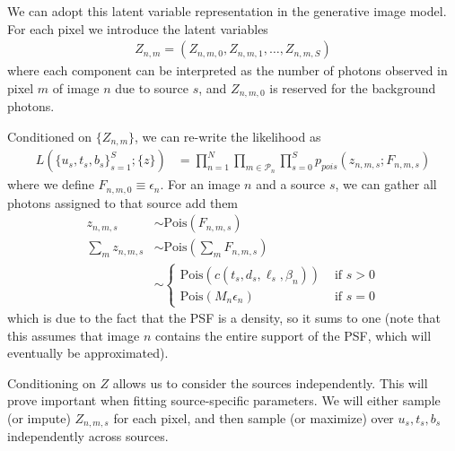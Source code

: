 \documentclass[11pt]{article}
\begin{document}
We can adopt this latent variable representation in the generative image model.  For each pixel we introduce the latent variables
\begin{align}
 Z_{n,m} = (Z_{n,m,0}, Z_{n,m,1}, \dots, Z_{n,m,S})
\end{align}
where each component can be interpreted as the number of photons observed in pixel $m$ of image $n$ due to source $s$, and $Z_{n,m,0}$ is reserved for the background photons.  

Conditioned on $\{Z_{n,m}\}$, we can re-write the likelihood as 
\begin{align}
  L(\{u_s, t_s, b_s\}_{s=1}^S; \{z\})
     &= \prod_{n=1}^N \prod_{m \in \mathcal{P}_n} \prod_{s=0}^S  p_{pois}(z_{n,m,s} ; F_{n,m, s}) 
\end{align}
where we define $F_{n,m,0} \equiv \epsilon_n$.  For an image $n$ and a source $s$, we can gather all photons assigned to that source add them
\begin{align}
  z_{n,m,s} &\sim \textrm{Pois}(F_{n,m,s}) \\
  \sum_{m} z_{n,m,s} &\sim \textrm{Pois}\left( \sum_{m} F_{n,m,s} \right) \\
    &\sim \begin{cases}
         \textrm{Pois}( c(t_s, d_s, \ell_s, \beta_n) ) & \text{ if } s > 0  \\
         \textrm{Pois}( M_n \epsilon_n ) & \text{ if } s = 0 
       \end{cases}
\end{align}
which is due to the fact that the PSF is a density, so it sums to one (note that this assumes that image $n$ contains the entire support of the PSF, which will eventually be approximated).  

Conditioning on $Z$ allows us to consider the sources independently.  This will prove important when fitting source-specific parameters.  We will either sample (or impute) $Z_{n,m,s}$ for each pixel, and then sample (or maximize) over $u_s, t_s, b_s$ independently across sources.  
\end{document}

